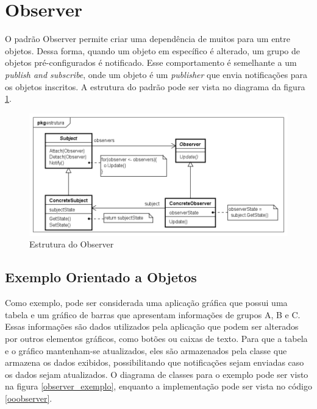\section{Observer}

O padrão Observer permite criar uma dependência de muitos 
para um entre objetos. Dessa forma, quando um 
objeto em específico é alterado, um grupo de objetos 
pré-configurados é notificado. Esse comportamento é 
semelhante a um \textit{publish and subscribe}, onde 
um objeto é um \textit{publisher} que envia notificações 
para os objetos inscritos. A estrutura do padrão pode ser 
vista no diagrama da figura \ref{observer_struct}.\cite{gamma:1995}

\begin{figure}[htb]
	\caption{\label{observer_struct}Estrutura do Observer}
	\begin{center}
	    \includegraphics[scale=0.5]{5_padroes-contexto-funcional/5.3_comportamentais/5.3.07_observer/observer_estrutura.png}
	\end{center}
\end{figure}

\subsection*{Exemplo Orientado a Objetos}

Como exemplo, pode ser considerada uma aplicação 
gráfica que possui uma tabela e um gráfico de 
barras que apresentam informações de grupos 
A, B e C. Essas informações são dados utilizados 
pela aplicação que podem ser alterados por outros 
elementos gráficos, como botões ou caixas de texto. 
Para que a tabela e o gráfico mantenham-se atualizados, 
eles são armazenados pela classe que armazena 
os dados exibidos, possibilitando que 
notificações sejam enviadas 
caso os dados sejam atualizados. O diagrama 
de classes para o exemplo pode ser visto na figura 
\ref{observer_exemplo}, enquanto a implementação 
pode ser vista no código \ref{ooobserver}.

